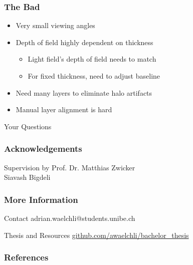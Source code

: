 \documentclass[12pt, compress]{beamer}
\begin{document}
\begin{frame}[fragile]
	\frametitle{The Bad}
	
	\begin{itemize}
		\item Very small viewing angles
		\item Depth of field highly dependent on thickness
		\begin{itemize}
			\item Light field's depth of field needs to match
			\item For fixed thickness, need to adjust baseline
		\end{itemize}
		\item Need many layers to eliminate halo artifacts
		\item Manual layer alignment is hard
	\end{itemize}
\end{frame}

\begin{frame}
	\begin{center}
		\LARGE Your Questions
	\end{center}
\end{frame}

\begin{frame}
	\frametitle{Acknowledgements}
	
	\begin{block}{Supervision by}
		Prof. Dr. Matthias Zwicker \\
		Siavash Bigdeli
	\end{block}
\end{frame}

\begin{frame}[fragile]
	\frametitle{More Information}
	
	\begin{block}{Contact}
  		adrian.waelchli@students.unibe.ch
	\end{block}
	
	\begin{block}{Thesis and Resources}
		\href{https://github.com/awaelchli/bachelor_thesis}{github.com/awaelchli/bachelor\_thesis}
	\end{block}
\end{frame}

\begin{frame}
	\frametitle{References}
	
	
%	
	\def\bibfont{\scriptsize}
	
\end{frame}
\end{document}
